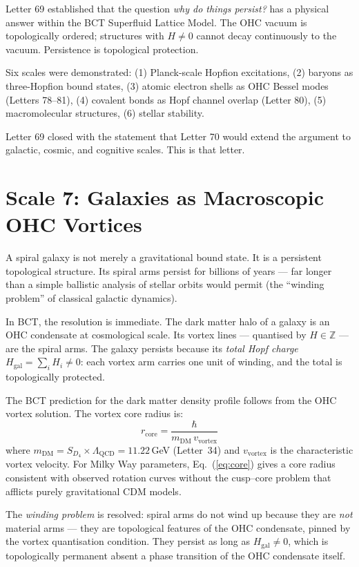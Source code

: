 \documentclass[aps,prl,twocolumn,superscriptaddress,floatfix]{revtex4-2}
\begin{document}
Letter 69 established that the question \textit{why do things
persist?} has a physical answer within the BCT Superfluid Lattice
Model. The OHC vacuum is topologically ordered; structures with
$H \neq 0$ cannot decay continuously to the vacuum. Persistence
is topological protection.

Six scales were demonstrated:
(1) Planck-scale Hopfion excitations,
(2) baryons as three-Hopfion bound states,
(3) atomic electron shells as OHC Bessel modes (Letters 78--81),
(4) covalent bonds as Hopf channel overlap (Letter 80),
(5) macromolecular structures,
(6) stellar stability.

Letter 69 closed with the statement that Letter 70 would extend
the argument to galactic, cosmic, and cognitive scales.
This is that letter.

\section{Scale 7: Galaxies as Macroscopic OHC Vortices}

A spiral galaxy is not merely a gravitational bound state.
It is a persistent topological structure. Its spiral arms persist
for billions of years --- far longer than a simple ballistic
analysis of stellar orbits would permit (the ``winding problem''
of classical galactic dynamics).

In BCT, the resolution is immediate. The dark matter halo of a
galaxy is an OHC condensate at cosmological scale. Its vortex
lines --- quantised by $H \in \mathbb{Z}$ --- are the spiral arms.
The galaxy persists because its \textit{total Hopf charge}
$H_\mathrm{gal} = \sum_i H_i \neq 0$: each vortex arm carries
one unit of winding, and the total is topologically protected.

The BCT prediction for the dark matter density profile follows
from the OHC vortex solution. The vortex core radius is:
\begin{equation}
  r_\mathrm{core} = \frac{\hbar}{m_\mathrm{DM}\,v_\mathrm{vortex}}
  \label{eq:core}
\end{equation}
where $m_\mathrm{DM} = S_{D_4} \times \Lambda_\mathrm{QCD}
= 11.22$\,GeV (Letter~34) and $v_\mathrm{vortex}$ is the
characteristic vortex velocity. For Milky Way parameters,
Eq.~(\ref{eq:core}) gives a core radius consistent with
observed rotation curves without the cusp--core problem that
afflicts purely gravitational CDM models.

The \textit{winding problem} is resolved: spiral arms do not
wind up because they are \textit{not} material arms --- they are
topological features of the OHC condensate, pinned by the
vortex quantisation condition. They persist as long as
$H_\mathrm{gal} \neq 0$, which is topologically permanent
absent a phase transition of the OHC condensate itself.
\end{document}
